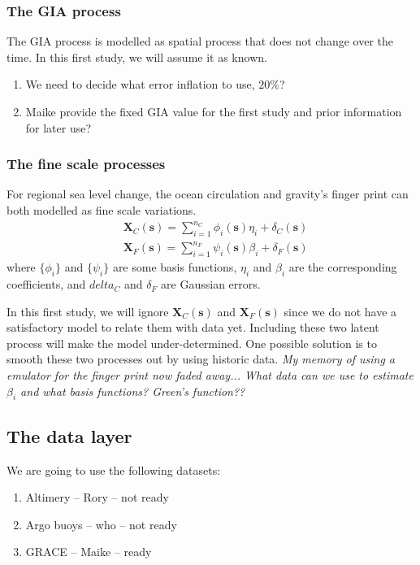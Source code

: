 \documentclass[cmbright,fleqn,referee]{envauth}
\newcommand{\bX}{\bm{X}}
\newcommand{\bs}{\bm{s}}
\begin{document}
\subsubsection{The GIA process}
The GIA process is modelled as spatial process that does not change over the time. In this first study, we will assume it as known. 
\begin{enumerate}
\item We need to decide what error inflation to use, $20\%$?
\item Maike provide the fixed GIA value for the first study and prior information for later use?
\end{enumerate}

\subsubsection{The fine scale processes}
For regional sea level change, the ocean circulation and gravity's finger print can both modelled as fine scale variations.
\begin{align}
&\bX_{C}(\bs) = \sum_{i=1}^{n_C} \phi_i(\bs)\eta_i + \delta_{C}(\bs) \\
&\bX_{F}(\bs) = \sum_{i=1}^{n_F} \psi_i(\bs)\beta_i + \delta_{F}(\bs)
\end{align}
where $\{\phi_i\}$ and $\{\psi_i\}$ are some basis functions, $\eta_i$ and $\beta_i$ are the corresponding coefficients, and $delta_C$ and $\delta_F$ are Gaussian errors.

In this first study, we will ignore $\bX_C(\bs)$ and $\bX_F(\bs)$ since we do not have a satisfactory model to relate them with data yet. Including these two latent process will make the model under-determined. One possible solution is to smooth these two processes out by using historic data. {\color{red} \emph{My memory of using a emulator for the finger print now faded away... What data can we use to estimate $\beta_i$ and what basis functions? Green's function??}}

\subsection{The data layer}
We are going to use the following datasets:
\begin{enumerate}
\item Altimery -- Rory -- not ready
\item Argo buoys -- who -- not ready
\item GRACE -- Maike -- ready
\end{enumerate}
\end{document}
